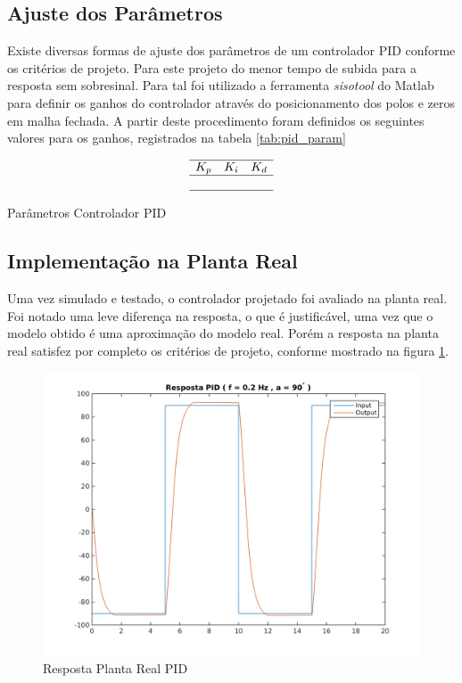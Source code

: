 \documentclass[a4paper,11pt]{article}
\begin{document}
\subsection{Ajuste dos Parâmetros}

Existe diversas formas de ajuste dos parâmetros de um controlador PID conforme os critérios de projeto. Para este projeto do menor tempo de subida para a resposta sem sobresinal. Para tal foi utilizado a ferramenta \textit{sisotool} do Matlab para definir os ganhos do controlador através do posicionamento dos polos e zeros em malha fechada. A partir deste procedimento foram definidos os seguintes valores para os ganhos, registrados na tabela \ref{tab:pid_param}

\begin{table}[H]
    \centering
    $$\begin{array}{ccc}
    \hline
        K_p & K_i & K_d\\
    \hline
         &  &\\
     \hline
    \end{array}$$
    \caption{Parâmetros Controlador PID}
    \label{tab:pid_param}
\end{table}


\subsection{Implementação na Planta Real}

Uma vez simulado e testado, o controlador projetado foi avaliado na planta real. Foi notado uma leve diferença na resposta, o que é justificável, uma vez que o modelo obtido é uma aproximação do modelo real. Porém a resposta na planta real satisfez por completo os critérios de projeto, conforme mostrado na figura \ref{fig:quaser_pid}.

\begin{figure}[H]
    \centering
    \includegraphics[width=0.8\linewidth]{tex/img/quanserpid_s90num5.png}
    \caption{Resposta Planta Real PID}
    \label{fig:quaser_pid}
\end{figure}
\end{document}
